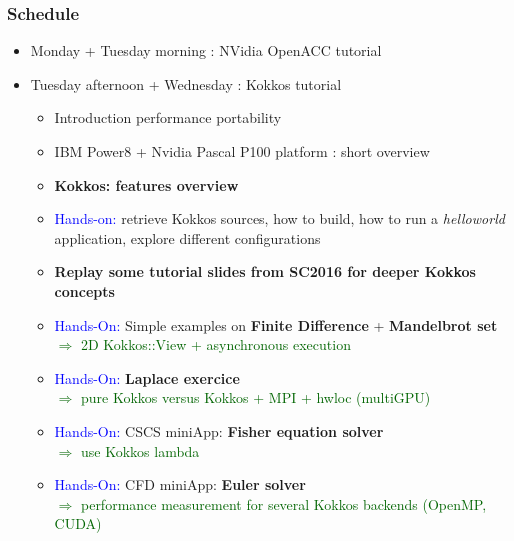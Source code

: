 \begin{frame}
  \frametitle{Schedule}

  \begin{itemize}
  \item Monday + Tuesday morning : NVidia OpenACC tutorial
  \item Tuesday afternoon + Wednesday : Kokkos tutorial
    \begin{itemize}
    \item Introduction performance portability
    \item IBM Power8 + Nvidia Pascal P100 platform : short overview
    \item \textbf{Kokkos: features overview}
    \item \textcolor{blue}{Hands-on:} retrieve Kokkos sources, how to build, how to run a \textit{helloworld} application, explore different configurations
    \item \textbf{Replay some tutorial slides from SC2016 for deeper Kokkos concepts}
    \item \textcolor{blue}{Hands-On:} Simple examples on \textbf{Finite Difference} +  \textbf{Mandelbrot set}\\
      \textcolor{darkgreen}{$\Rightarrow$ 2D Kokkos::View + asynchronous execution}
    \item \textcolor{blue}{Hands-On:} \textbf{Laplace exercice}\\
      \textcolor{darkgreen}{$\Rightarrow$ pure Kokkos versus Kokkos + MPI + hwloc (multiGPU)}
    \item \textcolor{blue}{Hands-On:} CSCS miniApp: \textbf{Fisher equation solver}\\
      \textcolor{darkgreen}{$\Rightarrow$ use Kokkos lambda}
    \item \textcolor{blue}{Hands-On:} CFD miniApp: \textbf{Euler solver}\\
      \textcolor{darkgreen}{$\Rightarrow$ performance measurement for several Kokkos backends (OpenMP, CUDA)}
    \end{itemize}
  \end{itemize}

\end{frame}
